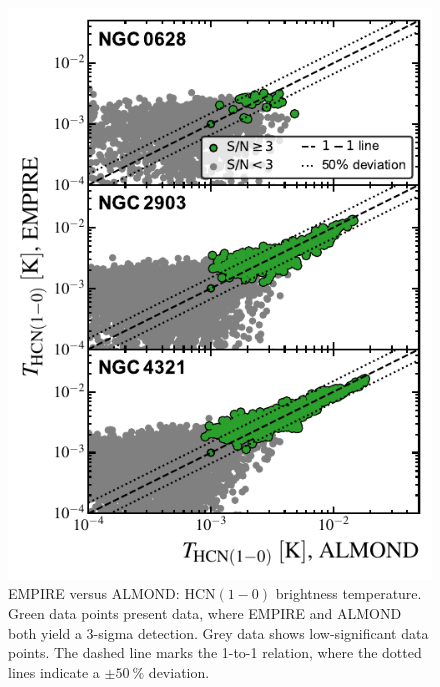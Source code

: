 \documentclass[letter, longauth]{aa} %
\newcommand*{\hcnone}{\ensuremath{\mathrm{HCN(1-0)}}\xspace} %
\begin{document}
\begin{appendix}
\begin{figure}
\centering
\includegraphics[width=\columnwidth]{Figures/ALMOND_vs_EMPIRE_brightness_temperatures_compressed_v2.pdf}
\caption{EMPIRE versus ALMOND: \hcnone brightness temperature.
Green data points present data, where EMPIRE and ALMOND both yield a 3-sigma detection.
Grey data shows low-significant data points.
The dashed line marks the 1-to-1 relation, where the dotted lines indicate a $\pm\SI{50}{\percent}$ deviation.
}
\label{fig:empire_vs_almond_brightness_temp}
\end{figure}


\end{appendix}
\end{document}
